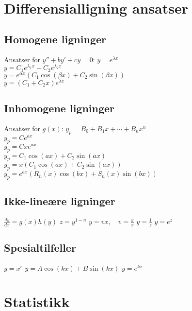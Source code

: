 \documentclass[a4paper,7pt,fleqn]{article}
\begin{document}
\begin{minipage}{\linewidth}

\section{Differensialligning ansatser}

\subsection{Homogene ligninger }
Ansatser for  \( y'' + by' + cy = 0 \):
\( y = e^{\lambda x} \)\\
\( y = C_1 e^{\lambda_1 x} + C_2 e^{\lambda_2 x} \)\\
\( y = e^{\alpha x}(C_1 \cos(\beta x) + C_2 \sin(\beta x)) \)\\
\( y = (C_1 + C_2 x)e^{\lambda x} \)\\


\subsection{Inhomogene ligninger}
Ansatser for \( g(x) \):
\( y_p = B_0 + B_1x + \cdots + B_nx^n \)\\
\( y_p = Ce^{ax} \) \\
\( y_p = Cxe^{ax} \)\\
\( y_p = C_1 \cos(ax) + C_2 \sin(ax) \) \\
\( y_p = x(C_1 \cos(ax) + C_2 \sin(ax)) \)\\
\( y_p = e^{ax}(R_n(x)\cos(bx) + S_n(x)\sin(bx)) \)\\


\subsection{Ikke-lineære ligninger}
\( \frac{dy}{dx} = g(x)h(y) \)
\( z = y^{1-n} \)
\( y = vx, \quad v = \frac{y}{x} \)
\( y = \frac{1}{z} \)
\( y = e^z \)

\subsection{Spesialtilfeller}
\( y = x^r \)
\( y = A\cos(kx) + B\sin(kx) \)
\( y = e^{kx} \)
\end{minipage}


\newpage
\section{Statistikk}
\end{document}
